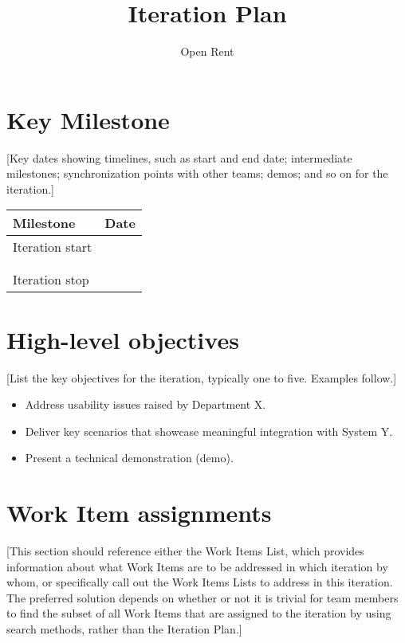 \documentclass{article}%
\begin{document}
\title{Iteration Plan}
\author{Open Rent}
\date{}
\maketitle

\section{Key Milestone}

[Key dates showing timelines, such as start and end date; intermediate milestones; synchronization points with other teams; demos; and so on for the iteration.]

\begin{tabular}{|l|l|}
\hline
Milestone       & Date \\ \hline
Iteration start &      \\ \hline
                &      \\ \hline
                &      \\ \hline
Iteration stop  &      \\ \hline
\end{tabular}

\section{High-level objectives}

[List the key objectives for the iteration, typically one to five. Examples follow.]
\begin{itemize}
	\item Address usability issues raised by Department X.
	\item	Deliver key scenarios that showcase meaningful integration with System Y.
	\item	Present a technical demonstration (demo).
\end{itemize}

\section{Work Item assignments}

[This section should reference either the Work Items List, which provides information about what Work Items are to be addressed in which iteration by whom, or specifically call out the Work Items Lists to address in this iteration. The preferred solution depends on whether or not it is trivial for team members to find the subset of all Work Items that are assigned to the iteration by using search methods, rather than the Iteration Plan.]
\end{document}
